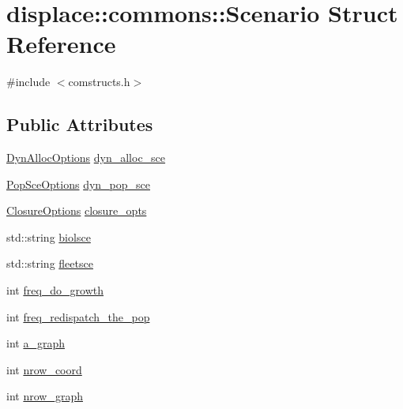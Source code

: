 \hypertarget{structdisplace_1_1commons_1_1_scenario}{}\section{displace\+::commons\+::Scenario Struct Reference}
\label{structdisplace_1_1commons_1_1_scenario}


{\ttfamily \#include $<$comstructs.\+h$>$}

\subsection*{Public Attributes}
\begin{DoxyCompactItemize}
\item 
\mbox{\hyperlink{class_dyn_alloc_options}{Dyn\+Alloc\+Options}} \mbox{\hyperlink{structdisplace_1_1commons_1_1_scenario_ac7b403a5ed958fcaf95351a0cbbdf067}{dyn\+\_\+alloc\+\_\+sce}}
\item 
\mbox{\hyperlink{class_pop_sce_options}{Pop\+Sce\+Options}} \mbox{\hyperlink{structdisplace_1_1commons_1_1_scenario_a9702de4b1059e5b4560393f50a1f6d25}{dyn\+\_\+pop\+\_\+sce}}
\item 
\mbox{\hyperlink{class_closure_options}{Closure\+Options}} \mbox{\hyperlink{structdisplace_1_1commons_1_1_scenario_a4e2fc763ee1ebd9abaa5eb1099036498}{closure\+\_\+opts}}
\item 
std\+::string \mbox{\hyperlink{structdisplace_1_1commons_1_1_scenario_a65e55f0092ab72a6720ece44daef1136}{biolsce}}
\item 
std\+::string \mbox{\hyperlink{structdisplace_1_1commons_1_1_scenario_a3d7ece5fdf8c9b2d1c51c8461753daae}{fleetsce}}
\item 
int \mbox{\hyperlink{structdisplace_1_1commons_1_1_scenario_a25dbdb611df95b8ca370ed6e0ca88249}{freq\+\_\+do\+\_\+growth}}
\item 
int \mbox{\hyperlink{structdisplace_1_1commons_1_1_scenario_a1d5aa41cf8b45abdc4f3d1b8e768b66c}{freq\+\_\+redispatch\+\_\+the\+\_\+pop}}
\item 
int \mbox{\hyperlink{structdisplace_1_1commons_1_1_scenario_ae368c1f244c7c569824fb4dd580420d3}{a\+\_\+graph}}
\item 
int \mbox{\hyperlink{structdisplace_1_1commons_1_1_scenario_a919ac16ce18c86b56e3b9885c74c9b20}{nrow\+\_\+coord}}
\item 
int \mbox{\hyperlink{structdisplace_1_1commons_1_1_scenario_a7e64e06b3b0c2d4acba20c89372ae279}{nrow\+\_\+graph}}
\item 

\end{DoxyCompactItemize}
